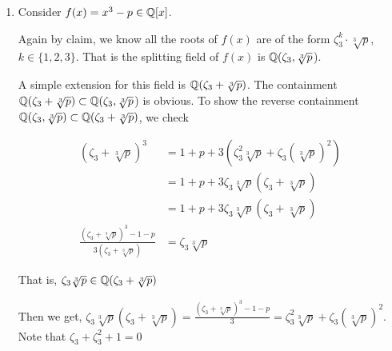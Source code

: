 \documentclass[12pt]{article}
\begin{document}
\begin{solution}
\begin{enumerate}
\begin{enumerate}
            \item $p > 2$
            Then, $\zeta_p \notin \Q(\sqrt[p]{3})$ since $\Q(\sqrt[p]{3}) \subset \R$, and $\zeta_p$ is not real for $p > 2$. From HW3, we know that 
            \[[\Q(\zeta_p):\Q] = p -1\]

            Since $\Q(\zeta_p)$ is a subfield of $K$, by tower law, 
            \[[K: \Q] = [K:\Q(\zeta_p)] \cdot [\Q(\zeta_p) : \Q] \]
            and, 
            \[[K:\Q(\zeta_p)] \leq p\]
            That is, $[K: \Q] \leq p(p-1) = n$. 

            Since both $\Q(\zeta_p)$ and $\Q(\sqrt[p]{3})$ are subfields of $K$, their degrees, $p$, $(p-1)$ must divide $n$. Since these two numbers are relatively prime it follows that $n$ is divisible by $p(p - 1)$ so we must have
            \[\left [\Q \left (\sqrt[p]{3}, \zeta_p \right ): \Q \right ]  = p \cdot (p-1)\]

        \end{enumerate}
        Hence proved. 
        \item Consider $f(x) = x^3 - p \in \mathbb Q[x]$. 
        
        Again by claim, we know all the roots of $f(x)$ are of the form $\zeta_3^k \cdot \sqrt[3]{p}$, $k \in \{1, 2, 3\}$. That is the splitting field of $f(x)$ is $\mathbb Q(\zeta_3,\sqrt[3]{p}$). 

        A simple extension for this field is $\mathbb Q(\zeta_3 + \sqrt[3]{p})$. The containment $\mathbb Q(\zeta_3 + \sqrt[3]{p}) \subset \mathbb Q(\zeta_3,\sqrt[3]{p}$) is obvious. To show the reverse containment $\mathbb Q( \zeta_3, \sqrt[3]{p}) \subset \mathbb Q( \zeta_3 +\sqrt[3]{p})$, we check

        \begin{align*}
            (\zeta_3+ \sqrt[3]{p})^3 &= 1 + p + 3(\zeta_3^2\sqrt[3]{p} + \zeta_3(\sqrt[3]{p})^2) \\ 
            &= 1 + p + 3\zeta_3\sqrt[3]{p}(\zeta_3 + \sqrt[3]{p}) \\ 
            &= 1 + p + 3\zeta_3\sqrt[3]{p}(\zeta_3 + \sqrt[3]{p}) \\
            \frac{(\zeta_3+ \sqrt[3]{p})^3  - 1 - p}{3(\zeta_3 + \sqrt[3]{p})} &= \zeta_3\sqrt[3]{p}
        \end{align*}

        That is, $\zeta_3\sqrt[3]{p} \in \mathbb Q(\zeta_3 + \sqrt[3]{p})$

        Then we get, $\zeta_3\sqrt[3]{p}(\zeta_3 + \sqrt[3]{p}) = \frac{(\zeta_3+ \sqrt[3]{p})^3  - 1 - p}{3} = \zeta_3^2\sqrt[3]{p} + \zeta_3(\sqrt[3]{p})^2$. Note that $\zeta_3 + \zeta_3^2 + 1 = 0$


\end{enumerate}
\end{solution}
\end{document}
